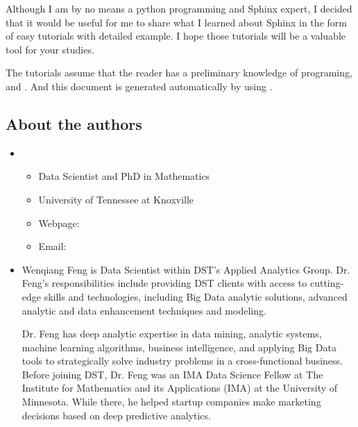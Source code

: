 \documentclass[letterpaper,11pt,english]{sphinxmanual}
\begin{document}
Although I am by no means a python programming and Sphinx expert,
I decided that it would be useful for me to share what I learned
about Sphinx in the form of easy tutorials with detailed example.
I hope those tutorials will be a valuable tool for your studies.

The tutorials assume that the reader has a preliminary knowledge of  programing,  and . And this document is generated automatically by using .


\subsection{About the authors}
\label{\detokenize{preface:about-the-authors}}\begin{itemize}
\item {} 
\begin{itemize}
\item {} 
Data Scientist and PhD in Mathematics

\item {} 
University of Tennessee at Knoxville

\item {} 
Webpage: 

\item {} 
Email: 

\end{itemize}

\item {} 

Wenqiang Feng is Data Scientist within DST’s Applied Analytics Group. Dr. Feng’s responsibilities include providing DST clients with access to cutting-edge skills and technologies, including Big Data analytic solutions, advanced analytic and data enhancement techniques and modeling.

Dr. Feng has deep analytic expertise in data mining, analytic systems, machine learning algorithms, business intelligence, and applying Big Data tools to strategically solve industry problems in a cross-functional business. Before joining DST, Dr. Feng was an IMA Data Science Fellow at The Institute for Mathematics and its Applications (IMA) at the University of Minnesota. While there, he helped startup companies make marketing decisions based on deep predictive analytics.


\end{itemize}
\end{document}
